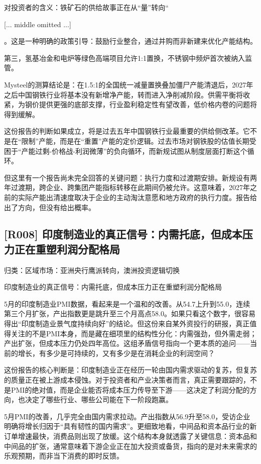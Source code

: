 \documentclass[11pt]{ctexart}
\begin{document}
对投资者的含义：铁矿石的供给故事正在从“量”转向“

[... middle omitted ...]

。这是一种明确的政策引导：鼓励行业整合，通过并购而非新建来优化产能结构。

第三，氢基冶金和电炉等绿色高端项目允许1:1置换，不锈钢中频炉首次被纳入监管。

Mysteel的测算结论是：在1.5:1的全国统一减量置换叠加僵尸产能清退后，2027年之后中国钢铁行业将基本没有新增净产能，转而进入净削减阶段。供需平衡将收紧，为钢价提供更强的底部支撑，行业盈利稳定性有望改善，低价格内卷的问题将得到缓解。

这份报告的判断如果成立，将是过去五年中国钢铁行业最重要的供给侧改革。它不是在“限制”产能，而是在“重置”产能的定价逻辑。过去市场对钢铁股的估值长期受困于“产能过剩-价格战-利润微薄”的负向循环，而新规试图从制度层面打断这个循环。

但这里有一个报告尚未完全回答的关键问题：执行力度和过渡期安排。新规设有两年过渡期，跨企业、跨集团产能指标转移在此期间仍被允许。这意味着，2027年之前的实际产能出清速度取决于企业的主动淘汰意愿和地方政府的执行力度。报告给出了方向，但没有给出概率。

\subsection{[R008] 印度制造业的真正信号：内需托底，但成本压力正在重塑利润分配格局}
{\small\color{refgray}归类：区域市场：亚洲央行鹰派转向，澳洲投资逻辑切换}

印度制造业的真正信号：内需托底，但成本压力正在重塑利润分配格局

5月的印度制造业PMI数据，看起来是一个温和的改善。从54.7上升到55.0，连续第三个月扩张，产出指数更是跳升至三个月高点58.0。如果只看这个数字，很容易得出“印度制造业景气度持续向好”的结论。但这份来自某外资投行的研报，真正值得关注的不是PMI本身，而是藏在细项里的结构性分化：内需强劲，但外需走弱；产出扩张，但成本压力仍处四年高位。这组矛盾信号指向一个更本质的追问——当前的增长，有多少是可持续的，又有多少是在消耗企业的利润空间？

这份报告的核心判断是：印度制造业正在经历一轮由国内需求驱动的复苏，但复苏的质量正在被上游成本侵蚀。对于投资者和产业决策者而言，真正需要跟踪的，不是PMI的绝对值，而是企业能否将成本压力传导至下游——这决定了利润分配的方向，也决定了哪些行业、哪些公司能在下一阶段跑赢。

5月PMI的改善，几乎完全由国内需求拉动。产出指数从56.9升至58.0，受访企业明确将增长归因于“具有韧性的国内需求”。更细致地看，中间品和资本品行业的新订单增速最快，消费品则出现了放缓。这个结构本身就透露了关键信息：资本品和中间品的扩张，通常意味着下游企业正在加大投资或备货，指向的是对未来需求的乐观预期，而非当下消费的即时反馈。
\end{document}
